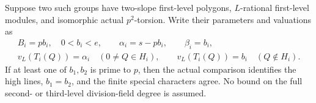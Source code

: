 \begin{proposition}
\label{prop:B-RD84-tame}
Suppose two such groups have two-slope first-level polygons,
\(L\)-rational first-level modules, and isomorphic actual
\(p^2\)-torsion. Write their parameters and valuations as
\[
 \begin{gathered}
 B_i=pb_i,\quad0<b_i<e,\qquad
 \alpha_i=s-pb_i,\qquad\beta_i=b_i,\\
 v_L(T_i(Q))=\alpha_i\quad(0\ne Q\in H_i),\qquad
 v_L(T_i(Q))=b_i\quad(Q\notin H_i).
 \end{gathered}                                      \tag{B-RD84.1}
\]
If at least one of \(b_1,b_2\) is prime to \(p\), then
the actual comparison identifies the high lines,
\(b_1=b_2\), and the finite special characters agree.
No bound on the full second- or third-level division-field
degree is assumed.
\end{proposition}
